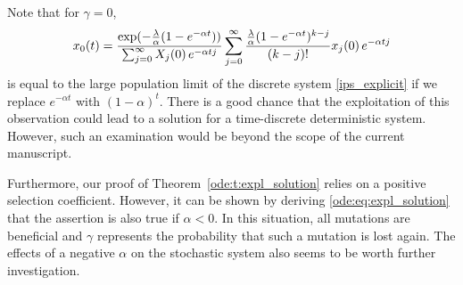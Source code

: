 \noindent
Note that for $\gamma = 0$,
\begin{align*}
 x_{0} \! \left( t \right)  = \frac{\exp(- \frac{\lambda}{\alpha}(1-e^{-\alpha t}))}
					  {\sum_{j=0}^\infty X_{j} \! \left( 0 \right) e^{-\alpha t j}}
				 \sum_{j=0}^\infty \frac{\frac{\lambda}{\alpha}(1-e^{-\alpha t})^{k-j}}
				 						{(k-j)!}
				 					 x_{j} \! \left( 0 \right)  e^{-\alpha t j}
\end{align*}
is equal to the large population limit of the discrete system \eqref{ips_explicit} if we replace
$e^{-\alpha t}$ with $(1-\alpha)^t$. There is a good chance that the
exploitation of this observation could lead to a solution for a time-discrete
deterministic system. However, such an examination would be beyond the scope of
the current manuscript.

Furthermore, our proof of Theorem~\ref{ode:t:expl_solution} relies on a positive selection
coefficient. However, it can be shown by deriving \eqref{ode:eq:expl_solution}
that the assertion is also true if $\alpha < 0$. In this situation, all
mutations are beneficial and $\gamma$ represents the probability that such a
mutation is lost again. The effects of a negative $\alpha$ on the stochastic
system also seems to be worth further investigation.
